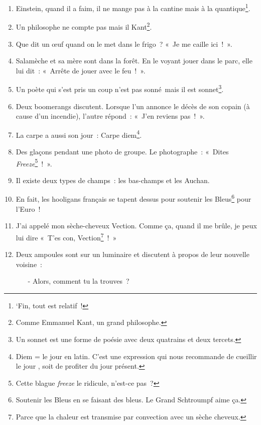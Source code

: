 \documentclass[10pt,a5paper,fullpage]{book}
\begin{document}
\begin{enumerate}
\begin{itemize}
			\item[-] On va aller aux criques~! C'est trop bien, non~?
			\item[-] Bof, je vais encore me faire démonter\footnote{Ah, on dirait que ce pneu a mal vécu son démontage, qui a été fait avec un cric.}... »
		\end{itemize}			
		\item Einstein, quand il a faim, il ne mange pas à la cantine mais à la quantique\footnote{‘Fin, tout est relatif~!}.
		\item Un philosophe ne compte pas mais il Kant\footnote{Comme Emmanuel Kant, un grand philosophe.}.
		\item Que dit un \oe{}uf quand on le met dans le frigo~? « Je me caille ici~! ».
		\item Salamèche et sa mère sont dans la forêt. En le voyant jouer dans le parc, elle lui dit~: «~Arrête de jouer avec le feu~!~».			
		\item Un poète qui s'est pris un coup n'est pas sonné mais il est sonnet\footnote{Un sonnet est une forme de poésie avec deux quatrains et deux tercets.}.
		\item Deux boomerangs discutent. Lorsque l’un annonce le décès de son copain (à cause d’un incendie), l’autre répond~: «~J’en reviens pas~!~».
		\item La carpe a aussi son jour~: Carpe diem\footnote{Diem = le jour en latin. C'est une expression qui nous recommande de \guillemotleft cueillir le jour \guillemotright, soit de profiter du jour présent.}.
		\item Des glaçons pendant une photo de groupe. Le photographe~: « Dites \textit{Freeze}\footnote{Cette blague \textit{freeze} le ridicule, n'est-ce pas~?}~! ».
		\item Il existe deux types de champs~: les bas-champs et les Auchan.
		\item En fait, les hooligans français se tapent dessus pour soutenir les Bleus\footnote{Soutenir les Bleus en se faisant des bleus. Le Grand Schtroumpf aime ça.} pour l’Euro~!
		\item J’ai appelé mon sèche-cheveux Vection. Comme ça, quand il me brûle, je peux lui dire « T’es con, Vection\footnote{Parce que la chaleur est transmise par convection avec un sèche cheveux.}~! »
		\item Deux ampoules sont sur un luminaire et discutent à propos de leur nouvelle voisine~:
		\begin{itemize}
			\item[-] Alors, comment tu la trouves~?

\end{itemize}
\end{enumerate}
\end{document}
